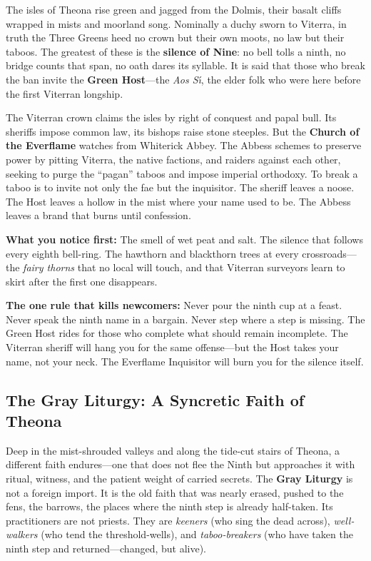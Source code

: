 \vspace{2mm}
\begin{tcolorbox}[colback=black!3,colframe=blue!60!black,title={Theme \& Atmosphere},breakable]
The isles of Theona rise green and jagged from the Dolmis, their basalt cliffs wrapped in mists and moorland song. Nominally a duchy sworn to Viterra, in truth the Three Greens heed no crown but their own moots, no law but their taboos. The greatest of these is the \textbf{silence of Nine}: no bell tolls a ninth, no bridge counts that span, no oath dares its syllable. It is said that those who break the ban invite the \textbf{Green Host}---the \textit{Aos S\'{\i}}, the elder folk who were here before the first Viterran longship. 

The Viterran crown claims the isles by right of conquest and papal bull. Its sheriffs impose common law, its bishops raise stone steeples. But the \textbf{Church of the Everflame} watches from Whiterick Abbey. The Abbess schemes to preserve power by pitting Viterra, the native factions, and raiders against each other, seeking to purge the ``pagan'' taboos and impose imperial orthodoxy. To break a taboo is to invite not only the fae but the inquisitor. The sheriff leaves a noose. The Host leaves a hollow in the mist where your name used to be. The Abbess leaves a brand that burns until confession.

\vspace{2mm}
\textbf{What you notice first:} The smell of wet peat and salt. The silence that follows every eighth bell-ring. The hawthorn and blackthorn trees at every crossroads---the \textit{fairy thorns} that no local will touch, and that Viterran surveyors learn to skirt after the first one disappears.

\textbf{The one rule that kills newcomers:} Never pour the ninth cup at a feast. Never speak the ninth name in a bargain. Never step where a step is missing. The Green Host rides for those who complete what should remain incomplete. The Viterran sheriff will hang you for the same offense---but the Host takes your name, not your neck. The Everflame Inquisitor will burn you for the silence itself.
\end{tcolorbox}

\subsection*{The Gray Liturgy: A Syncretic Faith of Theona}
\label{subsec:theona-gray-liturgy}

Deep in the mist-shrouded valleys and along the tide-cut stairs of Theona, a different faith endures---one that does not flee the Ninth but approaches it with ritual, witness, and the patient weight of carried secrets. The \textbf{Gray Liturgy} is not a foreign import. It is the old faith that was nearly erased, pushed to the fens, the barrows, the places where the ninth step is already half-taken. Its practitioners are not priests. They are \textit{keeners} (who sing the dead across), \textit{well-walkers} (who tend the threshold-wells), and \textit{taboo-breakers} (who have taken the ninth step and returned---changed, but alive).

